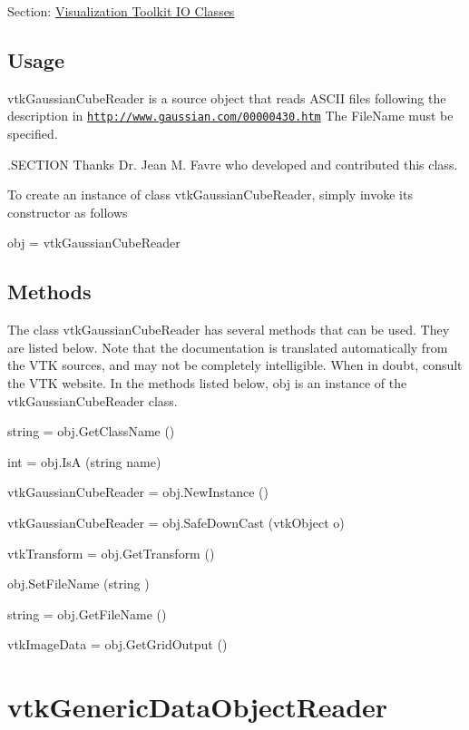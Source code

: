 Section\-: \hyperlink{sec_vtkio}{Visualization Toolkit I\-O Classes} \hypertarget{vtkwidgets_vtkxyplotwidget_Usage}{}\subsection{Usage}\label{vtkwidgets_vtkxyplotwidget_Usage}
vtk\-Gaussian\-Cube\-Reader is a source object that reads A\-S\-C\-I\-I files following the description in \href{http://www.gaussian.com/00000430.htm}{\tt http\-://www.\-gaussian.\-com/00000430.\-htm} The File\-Name must be specified.

.S\-E\-C\-T\-I\-O\-N Thanks Dr. Jean M. Favre who developed and contributed this class.

To create an instance of class vtk\-Gaussian\-Cube\-Reader, simply invoke its constructor as follows \begin{DoxyVerb}  obj = vtkGaussianCubeReader
\end{DoxyVerb}
 \hypertarget{vtkwidgets_vtkxyplotwidget_Methods}{}\subsection{Methods}\label{vtkwidgets_vtkxyplotwidget_Methods}
The class vtk\-Gaussian\-Cube\-Reader has several methods that can be used. They are listed below. Note that the documentation is translated automatically from the V\-T\-K sources, and may not be completely intelligible. When in doubt, consult the V\-T\-K website. In the methods listed below, {\ttfamily obj} is an instance of the vtk\-Gaussian\-Cube\-Reader class. 
\begin{DoxyItemize}
\item {\ttfamily string = obj.\-Get\-Class\-Name ()}  
\item {\ttfamily int = obj.\-Is\-A (string name)}  
\item {\ttfamily vtk\-Gaussian\-Cube\-Reader = obj.\-New\-Instance ()}  
\item {\ttfamily vtk\-Gaussian\-Cube\-Reader = obj.\-Safe\-Down\-Cast (vtk\-Object o)}  
\item {\ttfamily vtk\-Transform = obj.\-Get\-Transform ()}  
\item {\ttfamily obj.\-Set\-File\-Name (string )}  
\item {\ttfamily string = obj.\-Get\-File\-Name ()}  
\item {\ttfamily vtk\-Image\-Data = obj.\-Get\-Grid\-Output ()}  
\end{DoxyItemize}\hypertarget{vtkio_vtkgenericdataobjectreader}{}\section{vtk\-Generic\-Data\-Object\-Reader}\label{vtkio_vtkgenericdataobjectreader}
